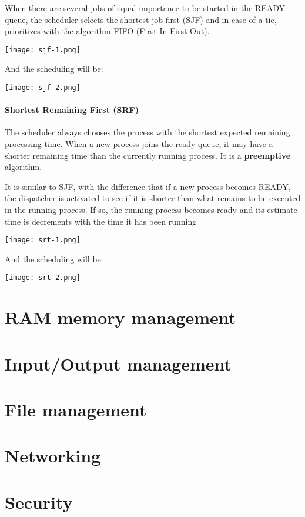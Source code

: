 When there are several jobs of equal importance to be started in the READY queue, the scheduler selects the shortest job first (SJF) and in case of a tie, prioritizes with the algorithm FIFO (First In First Out).

\begin{center}
    \texttt{[image: sjf-1.png]}
\end{center}

And the scheduling will be:

\begin{center}
    \texttt{[image: sjf-2.png]}
\end{center}


\subsubsection{Shortest Remaining First (SRF)}

The scheduler always chooses the process with the shortest expected remaining processing time. When a new process joins the ready queue, it may have a shorter remaining time than the currently running process.  It is a \textbf{preemptive} algorithm.

It is similar to SJF, with the difference that if a new process becomes READY, the dispatcher is activated to see if it is shorter than what remains to be executed in the running process. If so, the running process becomes ready and its estimate time is
decrements with the time it has been running

\begin{center}
    \texttt{[image: srt-1.png]}
\end{center}

And the scheduling will be:

\begin{center}
    \texttt{[image: srt-2.png]}
\end{center}




\chapter{RAM memory management}



\chapter{Input/Output management}


\chapter{File management}


\chapter{Networking}


\chapter{Security}